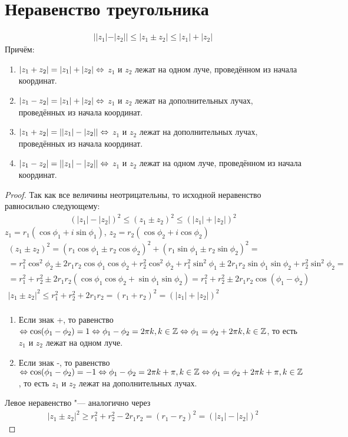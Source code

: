 \section{Неравенство треугольника}

\begin{theorem}{} 
\begin{gather*}
||z_1| - |z_2|| \leqslant |z_1 \pm z_2| \leqslant |z_1| + |z_2|
\end{gather*}
Причём:
\begin{enumerate}
	\item $|z_1 + z_2| = |z_1| + |z_2| \Leftrightarrow$ $z_1$ и $z_2$ лежат на одном луче, проведённом из начала координат.
	\item $|z_1 - z_2| = |z_1| + |z_2| \Leftrightarrow$ $z_1$ и $z_2$ лежат на дополнительных лучах, проведённых из начала координат.
	\item $|z_1 + z_2| = ||z_1| - |z_2|| \Leftrightarrow$ $z_1$ и $z_2$ лежат на дополнительных лучах, проведённых из начала координат.
	\item $|z_1 - z_2| = ||z_1| - |z_2|| \Leftrightarrow$ $z_1$ и $z_2$ лежат на одном луче, проведённом из начала координат.
\end{enumerate} 
\end{theorem}
\begin{proof}
Так как все величины неотрицательны, то исходной неравенство равносильно следующему:
\begin{gather*}
(|z_1|-|z_2|)^2 \leqslant (z_1 \pm z_2)^2 \leqslant (|z_1| + |z_2|)^2
\end{gather*}
$z_1 = r_1(\cos \phi_1 + i \sin \phi_1)$, $z_2 = r_2(\cos \phi_2 + i \cos \phi_2)$
\begin{gather*}
(z_1 \pm z_2)^2 = (r_1 \cos \phi_1 \pm r_2 \cos \phi_2)^2 + (r_1 \sin \phi_1 \pm r_2 \sin \phi_2)^2 = \\
= r_1^2 \cos^2 \phi_2 \pm 2r_1r_2 \cos \phi_1 \cos \phi_2 + r_2^2 \cos^2 \phi_2 + r_1^2 \sin^2 \phi_1 \pm 2r_1r_2 \sin \phi_1 \sin \phi_2 + r_2^2 \sin^2 \phi_2 = \\
= r_1^2 + r_2 ^2 \pm 2r_1r_2(\cos \phi_1 \cos \phi_2 + \sin \phi_1 \sin \phi_2) = r_1^2 + r_2^2 \pm 2r_1r_2 \cos(\phi_1 - \phi_2) \\
|z_1 \pm z_2|^2 \leqslant r_1^2 + r_2^2 + 2r_1r_2 = (r_1 + r_2)^2 = (|z_1| + |z_2|)^2 \\
\end{gather*}
\begin{enumerate}
	\item Если знак +, то равенство $\Leftrightarrow \cos(\phi_1 - \phi_2) = 1 \Leftrightarrow \phi_1 - \phi_2 = 2 \pi k, k \in \mathbb{Z} \Leftrightarrow \phi_1 = \phi_2 + 2 \pi k, k \in \mathbb{Z}$, то есть $z_1$ и $z_2$ лежат на одном луче.
	\item Если знак -, то равенство $\Leftrightarrow \cos(\phi_1 - \phi_2) = -1 \Leftrightarrow \phi_1 - \phi_2 = 2 \pi k + \pi, k \in \mathbb{Z} \Leftrightarrow \phi_1 = \phi_2 + 2 \pi k + \pi, k \in \mathbb{Z}$, то есть $z_1$ и $z_2$ лежат на дополнительных лучах.
\end{enumerate}
Левое неравенство "--- аналогично через
\begin{gather*}
|z_1 \pm z_2|^2 \geqslant r_1^2 + r_2^2 - 2r_1r_2 = (r_1 - r_2)^2 = (|z_1| - |z_2|)^2
\end{gather*}
\end{proof}